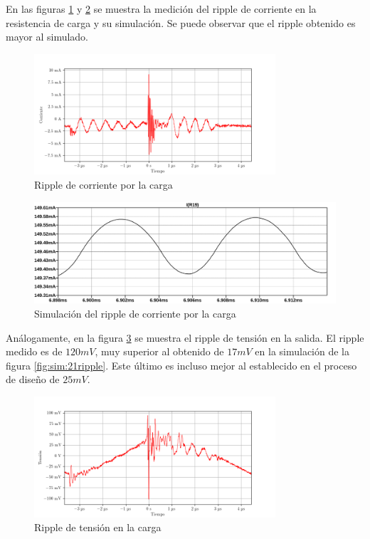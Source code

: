 En las figuras \ref{fig:osc:67} y \ref{fig:sim:14ripple} se muestra la medición  del ripple de corriente en la resistencia de carga y su simulación. Se puede observar que el ripple obtenido es mayor al simulado.



\begin{figure}[H]
    \centering
    \includegraphics[width=0.8\textwidth]{images/capturas-osciloscopio/17-11-2022/67.png}
    \caption{Ripple de corriente por la carga}
    \label{fig:osc:67}
\end{figure}

\begin{figure}[H]
    \centering
    \includegraphics[width=\textwidth]{images/sim/14-ripple.pdf}
    \caption{Simulación del ripple de corriente por la carga}
    \label{fig:sim:14ripple}
\end{figure}

Análogamente, en la figura \ref{fig:osc:58} se muestra el ripple de tensión en la salida. El ripple medido es de $120mV$, muy superior al obtenido de $17mV$ en la simulación de la figura \ref{fig:sim:21ripple}. Este último es incluso mejor al establecido en el proceso de diseño de $25mV$. 

\begin{figure}[H]
    \centering
    \includegraphics[width=0.8\textwidth]{images/capturas-osciloscopio/17-11-2022/58.png}
    \caption{Ripple de tensión en la carga}
    \label{fig:osc:58}
\end{figure}

